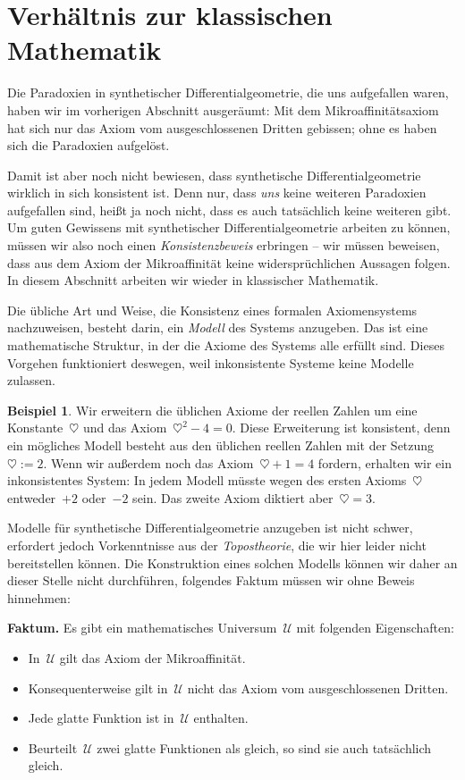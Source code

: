 \documentclass[twoside]{../zirkelblatt}
\newcommand{\U}{\mathcal{U}}
\theoremstyle{definition}
\newtheorem{bsp}[defn]{Beispiel}
\theoremstyle{plain}
\theoremstyle{remark}
\begin{document}
\section{Verhältnis zur klassischen Mathematik}

Die Paradoxien in synthetischer Differentialgeometrie, die uns aufgefallen
waren, haben wir im vorherigen Abschnitt ausgeräumt: Mit dem
Mikroaffinitätsaxiom hat sich nur das Axiom vom ausgeschlossenen Dritten
gebissen; ohne es haben sich die Paradoxien aufgelöst.

Damit ist aber noch nicht bewiesen, dass synthetische Differentialgeometrie
wirklich in sich konsistent ist. Denn nur, dass \emph{uns} keine weiteren
Paradoxien aufgefallen sind, heißt ja noch nicht, dass es auch tatsächlich
keine weiteren gibt. Um guten Gewissens mit synthetischer Differentialgeometrie
arbeiten zu können, müssen wir also noch einen \emph{Konsistenzbeweis}
erbringen -- wir müssen beweisen, dass aus dem Axiom der Mikroaffinität
keine widersprüchlichen Aussagen folgen. In diesem Abschnitt arbeiten wir
wieder in klassischer Mathematik.

Die übliche Art und Weise, die Konsistenz eines formalen Axiomensystems
nachzuweisen, besteht darin, ein \emph{Modell} des Systems anzugeben. Das ist
eine mathematische Struktur, in der die Axiome des Systems alle erfüllt sind.
Dieses Vorgehen funktioniert deswegen, weil inkonsistente Systeme keine Modelle
zulassen.

\begin{bsp}Wir erweitern die üblichen Axiome der reellen
Zahlen um eine Konstante~$\heartsuit$ und das Axiom~$\heartsuit^2 - 4 = 0$.
Diese Erweiterung ist konsistent, denn ein mögliches Modell besteht aus den
üblichen reellen Zahlen mit der Setzung~$\heartsuit := 2$. Wenn wir außerdem
noch das Axiom~$\heartsuit + 1 = 4$ fordern, erhalten wir ein inkonsistentes
System: In jedem Modell müsste wegen des ersten Axioms~$\heartsuit$
entweder~$+2$ oder~$-2$ sein. Das zweite Axiom diktiert aber~$\heartsuit =
3$.\end{bsp}

Modelle für synthetische Differentialgeometrie anzugeben ist nicht schwer,
erfordert jedoch Vorkenntnisse aus der \emph{Topostheorie}, die
wir hier leider nicht bereitstellen können. Die Konstruktion eines solchen Modells
können wir daher an dieser Stelle nicht durchführen, folgendes Faktum müssen wir
ohne Beweis hinnehmen:

\begin{shaded}
\textbf{Faktum.} Es gibt ein mathematisches Universum~$\U$ mit folgenden
Eigenschaften:
\begin{itemize}
\item In~$\U$ gilt das Axiom der Mikroaffinität.
\item Konsequenterweise gilt in~$\U$ nicht das Axiom vom ausgeschlossenen
Dritten.
\item Jede glatte Funktion ist in~$\U$ enthalten.
\item Beurteilt~$\U$ zwei glatte Funktionen als gleich, so sind sie
auch tatsächlich gleich.
\label{fact:sdg-universum}
\end{itemize}
\end{shaded}
\end{document}
